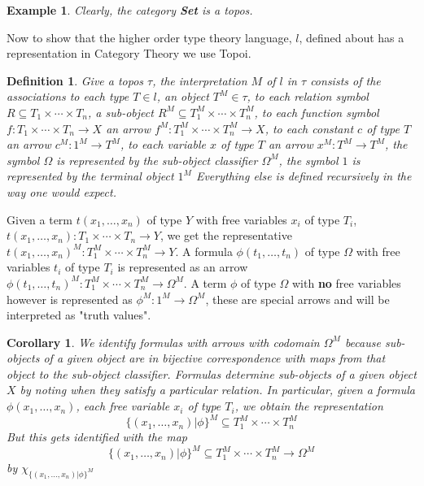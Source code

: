 \documentclass[12pt,a4paper]{article}
\newtheorem{corollary}[theorem]{Corollary}
\newtheorem{example}[theorem]{Example}
\newtheorem{definition}[theorem]{Definition}
\begin{document}
\begin{example}
    Clearly, the category \textbf{Set} is a topos.
\end{example}

Now to show that the higher order type theory language, $l$, defined about has a representation in Category Theory we use Topoi.

\begin{definition}
    Give a topos $\tau$, the interpretation $M$ of $l$ in $\tau$ consists of the associations to each type $T\in l$, an object $T^{M}\in \tau$, to each relation symbol $R\subseteq T_1\times\cdots \times T_n$, a sub-object $R^M\subseteq T_1^M\times\cdots\times T_n^M$, to each function symbol $f:T_1\times\cdots\times T_n\to X$ an arrow $f^M:T_1^M\times\cdots\times T_n^M\to X$, to each constant $c$ of type $T$ an arrow $c^M:1^M\to T^M$, to each variable $x$ of type $T$ an arrow $x^M:T^M\to T^M$, the symbol $\Omega$ is represented by the sub-object classifier $\Omega^M$, the symbol $1$ is represented by the terminal object $1^M$
    Everything else is defined recursively in the way one would expect.
\end{definition}

Given a term $t(x_1,\ldots,x_n)$ of type $Y$ with free variables $x_i$ of type $T_i$, $t(x_1,\ldots,x_n):T_1\times\cdots\times T_n\to Y$, we get the representative $t(x_1,\ldots,x_n)^M:T_1^M\times\cdots\times T_n^M\to Y$.
A formula $\phi(t_1,\ldots,t_n)$ of type $\Omega$ with free variables $t_i$ of type $T_i$ is represented as an arrow $\phi(t_1,\ldots, t_n)^M:T_1^M\times\cdots\times T_n^M\to \Omega^M$.
A term $\phi$ of type $\Omega$ with \textbf{no} free variables however is represented as $\phi^M:1^M\to\Omega^M$, these are special arrows and will be interpreted as "truth values".

\begin{corollary}
    We identify formulas with arrows with codomain $\Omega^M$ because sub-objects of a given object are in bijective correspondence with maps from that object to the sub-object classifier.
    Formulas determine sub-objects of a given object $X$ by noting when they satisfy a particular relation.
    In particular, given a formula $\phi(x_1,\ldots,x_n)$, each free variable $x_i$ of type $T_i$, we obtain the representation 
    \[
        \{(x_1,\ldots,x_n)|\phi\}^M\subseteq T_1^M\times\cdots\times T_n^M
    \]
    But this gets identified with the map 
    \[
        \{(x_1,\ldots,x_n)|\phi\}^M\subseteq T_1^M\times\cdots\times T_n^M\to \Omega^M
    \]
    by $\chi_{\{(x_1,\ldots,x_n)|\phi\}^M}$
\end{corollary}
\end{document}
